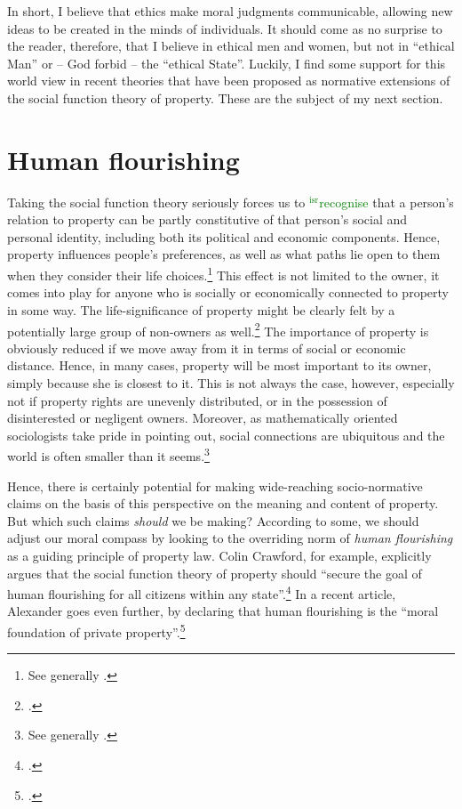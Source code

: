 \documentclass[12pt,a4paper]{book} %
\newcommand{\isr}[1]{\textcolor{green}{$^{\textrm{isr}}${#1}}}
\begin{document}
In short, I believe that ethics make moral judgments communicable, allowing new ideas to be created in the minds of individuals. It should come as no surprise to the reader, therefore, that I believe in ethical men and women, but not in ``ethical Man'' or -- God forbid --  the ``ethical State''. Luckily, I find some support for this world view in recent theories that have been proposed as normative extensions of the social function theory of property. These are the subject of my next section.

\section{Human flourishing}\label{sec:hf}

Taking the social function theory seriously forces us to \isr{recognise} that a person's relation to property can be partly constitutive of that person's social and personal identity, including both its political and economic components. Hence, property influences people's preferences, as well as what paths lie open to them when they consider their life choices.\footnote{See generally \cite{alexander09}.} This effect is not limited to the owner, it comes into play for anyone who is socially or economically connected to property in some way. The life-significance of property might be clearly felt by a potentially large group of non-owners as well.\footcite[128-129]{alexander09d} The importance of property is obviously reduced if we move away from it in terms of social or economic distance. Hence, in many cases, property will be most important to its owner, simply because she is closest to it. This is not always the case, however, especially not if property rights are unevenly distributed, or in the possession of disinterested or negligent owners. Moreover, as mathematically oriented sociologists take pride in pointing out, social connections are ubiquitous  and the world is often smaller than it seems.\footnote{See generally \cite{schnettler09}.}

Hence, there is certainly potential for making wide-reaching socio-normative claims on the basis of this perspective on the meaning and content of property. But which such claims {\it should} we be making? According to some, we should adjust our moral compass by looking to the overriding norm of {\it human flourishing} as a guiding principle of property law. Colin Crawford, for example, explicitly argues that the social function theory of property should ``secure the goal of human flourishing for all citizens within any state''.\footcite[1089]{crawford11} In a recent article, Alexander goes even further, by declaring that human flourishing is the ``moral foundation of private property''.\footcite[1261]{alexander14} 
\end{document}
